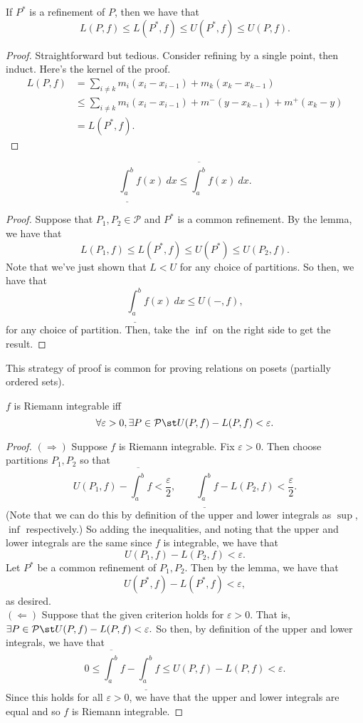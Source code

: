 \documentclass{notes}
\begin{document}
\begin{lemma}
  If $P^*$ is a refinement of $P$, then we have that 
  $$L(P, f) \leq L(P^*, f) \leq U(P^*, f) \leq U(P, f).$$
\end{lemma}
\begin{proof}
 Straightforward but tedious. Consider refining by a single point, then induct. 
 Here's the kernel of the proof.
 \begin{align*}
   L(P,f) &= \sum_{i\neq k} m_i(x_i - x_{i-1}) + m_k(x_k - x_{k-1}) \\
          &\leq \sum_{i\neq k} m_i(x_i - x_{i-1}) + m^-(y - x_{k-1}) + m^+(x_k - y) \\
          &= L(P^*, f).
 \end{align*}
\end{proof}
\begin{corollary}
 $$ \underline{\int_a^b} f(x)\ dx \leq \overline{\int_a^b} f(x)\ dx. $$
\end{corollary}
\begin{proof}
  Suppose that $P_1, P_2 \in \mathcal{P}$ and $P^*$ is a common refinement. By the lemma, we have
  that 
  $$L(P_1, f) \leq L(P^*, f) \leq U(P^*) \leq U(P_2, f).$$
  Note that we've just shown that $L < U$ for any choice of partitions. So then, we have that
  $$\underline{\int_a^b} f(x)\ dx \leq U(-, f),$$ for any choice of partition. Then, take the $\inf$
  on the right side to get the result.
\end{proof}
This strategy of proof is common for proving relations on posets (partially ordered sets).

\begin{theorem}
  $f$ is Riemann integrable iff 
  $$\forall \varepsilon > 0, \exists P\in \mathcal{P} \st U(P,f) - L(P,f) < \varepsilon.$$
\end{theorem}
\begin{proof}
  $(\Rightarrow)$ Suppose $f$ is Riemann integrable. Fix $\varepsilon > 0$. Then choose partitions 
  $P_1, P_2$ so that 
  $$U(P_1, f) - \overline{\int_a^b}f < \frac{\varepsilon}{2}, \qquad 
  \underline{\int_a^b}f - L(P_2, f) < \frac{\varepsilon}{2}.$$ (Note that we can do this by
  definition of the upper and lower integrals as $\sup$, $\inf$ respectively.) So adding the
  inequalities, and noting that the upper and lower integrals are the same since $f$ is integrable,
  we have that 
  $$U(P_1, f) - L(P_2, f) < \varepsilon.$$
  Let $P^*$ be a common refinement of $P_1, P_2$. Then by the lemma, we have that 
  $$U(P^*, f) - L(P^*, f) < \varepsilon,$$ as desired. \\

  $(\Leftarrow)$ Suppose that the given criterion holds for $\varepsilon > 0$. That is, $\exists
  P\in\mathcal{P} \st U(P, f) - L(P, f) < \varepsilon.$ So then, by definition of the upper and
  lower integrals, we have that 
  $$0 \leq \overline{\int_a^b}f - \underline{\int_a^b}f \leq U(P, f) - L(P, f) < \varepsilon.$$ 
  Since this holds for all $\varepsilon > 0$, we have that the upper and lower integrals are equal
  and so $f$ is Riemann integrable.
\end{proof}
\end{document}
